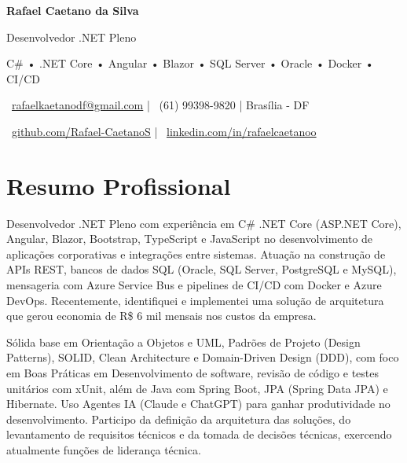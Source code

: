 \documentclass[11pt,a4paper]{article}
\begin{document}

\begin{center}

{\Huge\bfseries Rafael Caetano da Silva}

\vspace{5pt}

{\Large Desenvolvedor .NET Pleno}

\vspace{4pt}

{\small
C\# • .NET Core • Angular • Blazor • SQL Server • Oracle • Docker • CI/CD
}

\vspace{6pt}

\small

\faEnvelope\
\href{mailto:rafaelkaetanodf@gmail.com}{rafaelkaetanodf@gmail.com}
\quad|\quad
\faPhone\
(61) 99398-9820
\quad|\quad
\faMapMarker*
Brasília - DF

\vspace{3pt}

\faGithub\
\href{https://github.com/Rafael-CaetanoS}{github.com/Rafael-CaetanoS}
\quad|\quad
\faLinkedin\
\href{https://linkedin.com/in/rafaelcaetanoo}{linkedin.com/in/rafaelcaetanoo}

\end{center}

\vspace{-0.2cm}
\section{Resumo Profissional}

Desenvolvedor .NET Pleno com experiência em C\# .NET Core (ASP.NET Core), Angular, Blazor, Bootstrap, TypeScript e JavaScript no desenvolvimento de aplicações corporativas e integrações entre sistemas. Atuação na construção de APIs REST, bancos de dados SQL (Oracle, SQL Server, PostgreSQL e MySQL), mensageria com Azure Service Bus e pipelines de CI/CD com Docker e Azure DevOps. Recentemente, identifiquei e implementei uma solução de arquitetura que gerou economia de R\$ 6 mil mensais nos custos da empresa.

\vspace{0.15cm}

Sólida base em Orientação a Objetos e UML, Padrões de Projeto (Design Patterns), SOLID, Clean Architecture e Domain-Driven Design (DDD), com foco em Boas Práticas em Desenvolvimento de software, revisão de código e testes unitários com xUnit, além de Java com Spring Boot, JPA (Spring Data JPA) e Hibernate. Uso Agentes IA (Claude e ChatGPT) para ganhar produtividade no desenvolvimento. Participo da definição da arquitetura das soluções, do levantamento de requisitos técnicos e da tomada de decisões técnicas, exercendo atualmente funções de liderança técnica.
\end{document}
